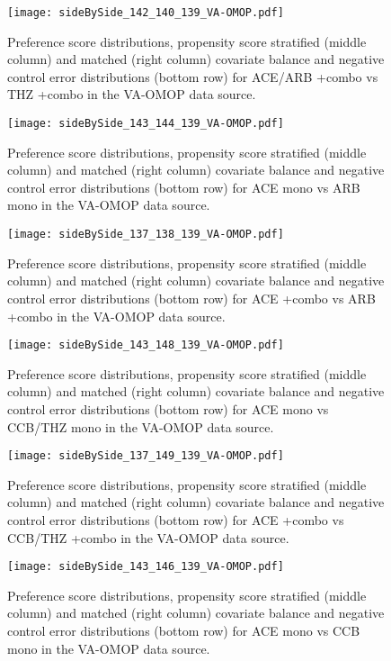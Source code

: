 \documentclass[11pt,]{article}
\begin{document}
\begin{figure}
    \caption{Preference score distributions,
    propensity score stratified (middle column) and matched (right column) covariate balance
    and negative control error distributions (bottom row) for
    ACE/ARB +combo vs THZ +combo in the VA-OMOP data source.}
    \centerline{
        \texttt{[image: sideBySide\_142\_140\_139\_VA-OMOP.pdf]}
    }
\end{figure}
\begin{figure}
    \caption{Preference score distributions,
    propensity score stratified (middle column) and matched (right column) covariate balance
    and negative control error distributions (bottom row) for
    ACE mono vs ARB mono in the VA-OMOP data source.}
    \centerline{
        \texttt{[image: sideBySide\_143\_144\_139\_VA-OMOP.pdf]}
    }
\end{figure}
\begin{figure}
    \caption{Preference score distributions,
    propensity score stratified (middle column) and matched (right column) covariate balance
    and negative control error distributions (bottom row) for
    ACE +combo vs ARB +combo in the VA-OMOP data source.}
    \centerline{
        \texttt{[image: sideBySide\_137\_138\_139\_VA-OMOP.pdf]}
    }
\end{figure}
\begin{figure}
    \caption{Preference score distributions,
    propensity score stratified (middle column) and matched (right column) covariate balance
    and negative control error distributions (bottom row) for
    ACE mono vs CCB/THZ mono in the VA-OMOP data source.}
    \centerline{
        \texttt{[image: sideBySide\_143\_148\_139\_VA-OMOP.pdf]}
    }
\end{figure}
\begin{figure}
    \caption{Preference score distributions,
    propensity score stratified (middle column) and matched (right column) covariate balance
    and negative control error distributions (bottom row) for
    ACE +combo vs CCB/THZ +combo in the VA-OMOP data source.}
    \centerline{
        \texttt{[image: sideBySide\_137\_149\_139\_VA-OMOP.pdf]}
    }
\end{figure}
\begin{figure}
    \caption{Preference score distributions,
    propensity score stratified (middle column) and matched (right column) covariate balance
    and negative control error distributions (bottom row) for
    ACE mono vs CCB mono in the VA-OMOP data source.}
    \centerline{
        \texttt{[image: sideBySide\_143\_146\_139\_VA-OMOP.pdf]}
    }
\end{figure}
\end{document}
